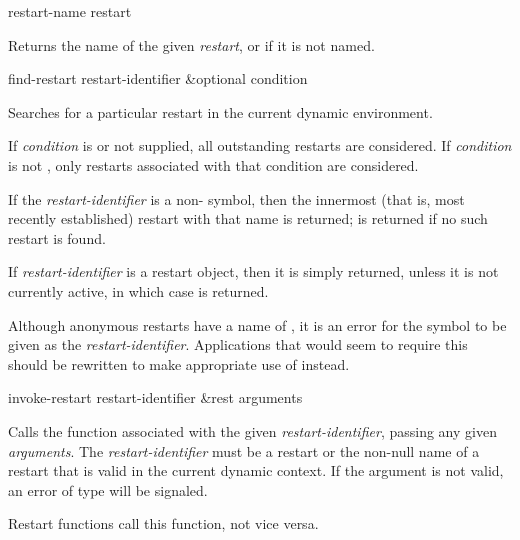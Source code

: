 \begin{defun}[Function]
restart-name restart

Returns the name of the given \emph{restart}, or  if it is not named.
\end{defun}

\begin{defun}[Function]
find-restart restart-identifier &optional condition

Searches for a particular restart in the current dynamic environment.

If \emph{condition} is  or not supplied, all outstanding restarts
are considered.
If \emph{condition} is not , only restarts associated
with that condition are considered.

If the \emph{restart-identifier} is a non- symbol, then the innermost
(that is, most recently established) restart with that name is returned;
 is returned if no such restart is found.

If \emph{restart-identifier} is a restart object, then it is simply returned,
unless it is not currently active, in which case  is returned.

Although anonymous restarts have a name of , it is an error for the
symbol  to be given as the \emph{restart-identifier}.  Applications
that would seem to require this should be rewritten to make appropriate use of
 instead.
\end{defun}

\begin{defun}[Function]
invoke-restart restart-identifier &rest arguments

Calls the function associated with the given \emph{restart-identifier}, passing
any given \emph{arguments}. The \emph{restart-identifier} must be a restart or
the non-null name of a restart that is valid in the current dynamic context. If
the argument is not valid, an error of type  will be
signaled.

\beforenoterule
\begin{implementation} 
Restart functions call this function, not vice versa.
\end{implementation} 
\afternoterule
\end{defun}


